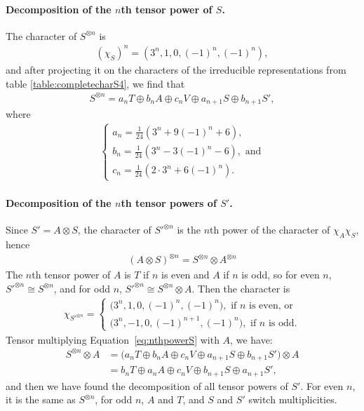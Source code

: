 \begin{example}
	\paragraph{Decomposition of the $n$th tensor power of $S$.} The character of $S^{\otimes n}$ is 
	\begin{align*}
		(\chi_S)^n = (3^n, 1, 0, (-1)^n, (-1)^n),
	\end{align*}
	and after projecting it on the characters of the irreducible representations from table \ref{table:completecharS4}, we find that
	\begin{align}\label{eq:nthpowerS}
		S^{\otimes n} = a_n T \oplus b_n A \oplus c_n V \oplus a_{n+1} S \oplus b_{n+1} S',
	\end{align}
	where 
	\begin{align*}
		\begin{cases}
			a_n = \frac{1}{24}(3^n + 9(-1)^n+6), \\
			b_n = \frac{1}{24}(3^n - 3(-1)^n -6), \text{ and} \\
			c_n = \frac{1}{24}(2\cdot 3^n + 6(-1)^n).
		\end{cases}
	\end{align*}
	
	\paragraph{Decomposition of the $n$th tensor powers of $S'$.} Since $S' = A \otimes S$, the character of $S'^{\otimes n}$ is the $n$th power of the character of $\chi_A \chi_S$, hence%
	\begin{align*}
		(A \otimes S)^{\otimes n} = S^{\otimes n} \otimes A^{\otimes n}
	\end{align*}
	The $n$th tensor power of $A$ is $T$ if $n$ is even and $A$ if $n$ is odd, so for even $n$, $S'^{\otimes n} \cong S^{\otimes n}$, and for odd $n$, $S'^{\otimes n} \cong S^{\otimes n} \otimes A$. Then the character is 
	\begin{align*}
		\chi_{S'^{\otimes n}} = \begin{cases}
			\big(3^n,1,0,(-1)^{n}, (-1)^n\big), \text{ if } n \text{ is even, or} \\
			\big(3^n,-1,0,(-1)^{n+1}, (-1)^n\big), \text{ if } n \text{ is odd.}
		\end{cases}
	\end{align*}
	Tensor multiplying Equation~\ref{eq:nthpowerS} with $A$, we have:
	\begin{align*}
		S^{\otimes n} \otimes A &= \Big(a_n T \oplus b_n A \oplus c_n V \oplus a_{n+1} S \oplus b_{n+1} S'\Big)\otimes A \\
		&= b_n T \oplus a_n A \oplus c_n V \oplus b_{n+1} S \oplus a_{n+1} S',
	\end{align*}
	and then we have found the decomposition of all tensor powers of $S'$. For even $n$, it is the same as $S^{\otimes n}$, for odd $n$, $A$ and $T$, and $S$ and $S'$ switch multiplicities.
	

\end{example}
